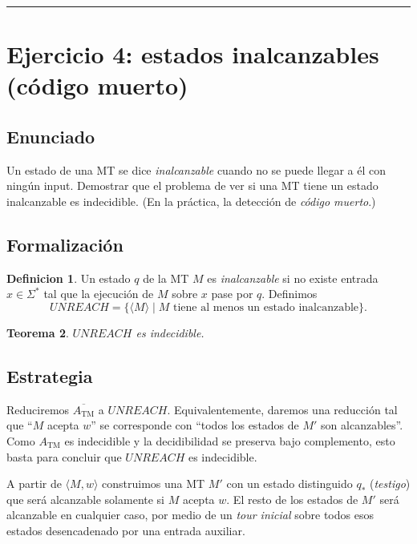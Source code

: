 \documentclass[11pt,a4paper]{article}
\theoremstyle{plain}
\newtheorem{teorema}{Teorema}[section]
\theoremstyle{definition}
\newtheorem{definicion}[teorema]{Definicion}
\theoremstyle{remark}
\newcommand{\TM}{\mathrm{TM}}
\newcommand{\enc}[1]{\langle #1\rangle}
\newcommand{\encMw}{\langle M, w\rangle}
\newcommand{\Sstar}{\Sigma^{*}}
\newcommand{\compl}[1]{\overline{#1}}
\newcommand{\ATM}{A_{\TM}}
\begin{document}
\bigskip\hrule\bigskip

\section{Ejercicio 4: estados inalcanzables (c\'odigo muerto)}
\label{sec:ej4}

\subsection*{Enunciado}

Un estado de una MT se dice \emph{inalcanzable} cuando no se puede llegar a
\'el con ning\'un input. Demostrar que el problema de ver si una MT tiene
un estado inalcanzable es indecidible. (En la pr\'actica, la detecci\'on
de \emph{c\'odigo muerto}.)

\subsection*{Formalizaci\'on}

\begin{definicion}
\label{def:UNREACH}
Un estado $q$ de la MT $M$ es \emph{inalcanzable} si no existe entrada
$x\in\Sstar$ tal que la ejecuci\'on de $M$ sobre $x$ pase por $q$.
Definimos
\[
  UNREACH = \{\enc{M} \mid M \text{ tiene al menos un estado inalcanzable}\}.
\]
\end{definicion}

\begin{teorema}
\label{teo:ej4}
$UNREACH$ es indecidible.
\end{teorema}

\subsection*{Estrategia}

Reduciremos $\compl{\ATM}$ a $UNREACH$. Equivalentemente, daremos una
reducci\'on tal que ``$M$ acepta $w$'' se corresponde con ``todos los
estados de $M'$ son alcanzables''. Como $\ATM$ es indecidible y la
decidibilidad se preserva bajo complemento, esto basta para concluir que
$UNREACH$ es indecidible.

A partir de $\encMw$ construimos una MT $M'$ con un estado distinguido
$q_*$ (\emph{testigo}) que ser\'a alcanzable solamente si $M$ acepta $w$.
El resto de los estados de $M'$ ser\'a alcanzable en cualquier caso, por
medio de un \emph{tour inicial} sobre todos esos estados desencadenado
por una entrada auxiliar.
\end{document}
